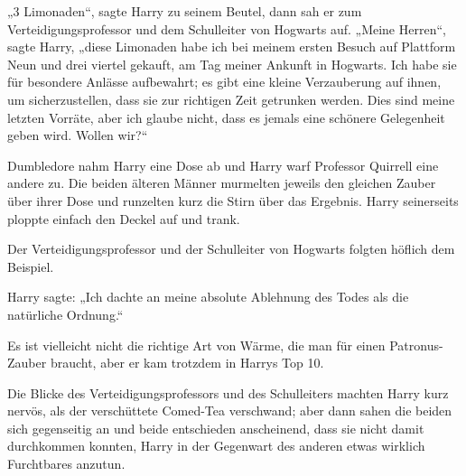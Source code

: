 „3 Limonaden“, sagte Harry zu seinem Beutel, dann sah er zum Verteidigungsprofessor und dem Schulleiter von Hogwarts auf.
„Meine Herren“, sagte Harry, „diese Limonaden habe ich bei meinem ersten Besuch auf Plattform Neun und drei viertel gekauft, am Tag meiner Ankunft in Hogwarts. Ich habe sie für besondere Anlässe aufbewahrt; es gibt eine kleine Verzauberung auf ihnen, um sicherzustellen, dass sie zur richtigen Zeit getrunken werden. Dies sind meine letzten Vorräte, aber ich glaube nicht, dass es jemals eine schönere Gelegenheit geben wird. Wollen wir?“

Dumbledore nahm Harry eine Dose ab und Harry warf Professor Quirrell eine andere zu. Die beiden älteren Männer murmelten jeweils den gleichen Zauber über ihrer Dose und runzelten kurz die Stirn über das Ergebnis. Harry seinerseits ploppte einfach den Deckel auf und trank.

Der Verteidigungsprofessor und der Schulleiter von Hogwarts folgten höflich dem Beispiel.

Harry sagte:
„Ich dachte an meine absolute Ablehnung des Todes als die natürliche Ordnung.“

Es ist vielleicht nicht die richtige Art von Wärme, die man für einen Patronus-Zauber braucht, aber er kam trotzdem in Harrys Top 10.

Die Blicke des Verteidigungsprofessors und des Schulleiters machten Harry kurz nervös, als der verschüttete Comed-Tea verschwand; aber dann sahen die beiden sich gegenseitig an und beide entschieden anscheinend, dass sie nicht damit durchkommen konnten, Harry in der Gegenwart des anderen etwas wirklich Furchtbares anzutun.

